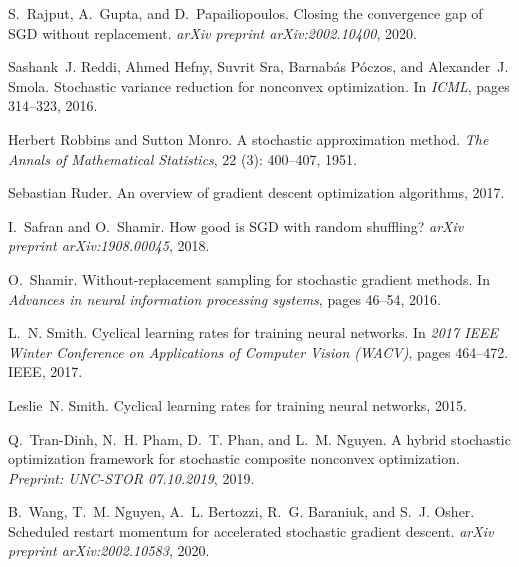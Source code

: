 \begin{thebibliography}{42}
S.~Rajput, A.~Gupta, and D.~Papailiopoulos.
\newblock Closing the convergence gap of {SGD} without replacement.
\newblock \emph{arXiv preprint arXiv:2002.10400}, 2020.

Sashank~J. Reddi, Ahmed Hefny, Suvrit Sra, Barnab{\'{a}}s P{\'{o}}czos, and
  Alexander~J. Smola.
\newblock Stochastic variance reduction for nonconvex optimization.
\newblock In \emph{ICML}, pages 314--323, 2016.

Herbert Robbins and Sutton Monro.
\newblock A stochastic approximation method.
\newblock \emph{The Annals of Mathematical Statistics}, 22
  (3): 400--407, 1951.

Sebastian Ruder.
\newblock An overview of gradient descent optimization algorithms, 2017.

I.~Safran and O.~Shamir.
\newblock How good is {SGD} with random shuffling?
\newblock \emph{arXiv preprint arXiv:1908.00045}, 2018.

O.~Shamir.
\newblock Without-replacement sampling for stochastic gradient methods.
\newblock In \emph{Advances in neural information processing systems}, pages
  46--54, 2016.

L.~N. Smith.
\newblock Cyclical learning rates for training neural networks.
\newblock In \emph{2017 IEEE Winter Conference on Applications of Computer
  Vision (WACV)}, pages 464--472. IEEE, 2017.

Leslie~N. Smith.
\newblock Cyclical learning rates for training neural networks, 2015.

Q.~Tran-Dinh, N.~H. Pham, D.~T. Phan, and L.~M. Nguyen.
\newblock A hybrid stochastic optimization framework for stochastic composite
  nonconvex optimization.
\newblock \emph{Preprint: UNC-STOR 07.10.2019}, 2019.

B.~Wang, T.~M. Nguyen, A.~L. Bertozzi, R.~G. Baraniuk, and S.~J. Osher.
\newblock Scheduled restart momentum for accelerated stochastic gradient
  descent.
\newblock \emph{arXiv preprint arXiv:2002.10583}, 2020.


\end{thebibliography}
